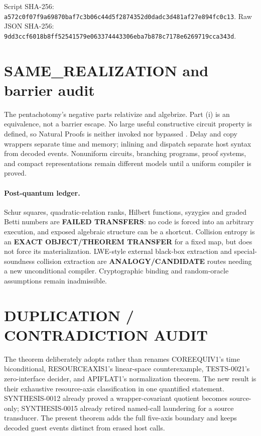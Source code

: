 \documentclass[11pt]{article}
\begin{document}
Script SHA-256:
\nolinkurl{a572c0f07f9a69870baf7c3b06c44d5f2874352d0dadc3d481af27e894fc0c13}.
Raw JSON SHA-256:
\nolinkurl{9dd3ccf6018b8ff52541579e063374443306eba7b878c7178e6269719cca343d}.

\section{SAME\_REALIZATION and barrier audit}
The pentachotomy's negative parts relativize and algebrize.  Part (i) is an
equivalence, not a barrier escape.  No large useful constructive circuit
property is defined, so Natural Proofs is neither invoked nor bypassed
\cite{RR97}.  Delay and copy wrappers separate time and memory; inlining and
dispatch separate host syntax from decoded events.  Nonuniform circuits,
branching programs, proof systems, and compact representations remain
different models until a uniform compiler is proved.

\paragraph{Post-quantum ledger.}
Schur squares, quadratic-relation ranks, Hilbert functions, syzygies and
graded Betti numbers are \textbf{FAILED TRANSFERS}: no code is forced into
an arbitrary execution, and exposed algebraic structure can be a shortcut.
Collision entropy is an \textbf{EXACT OBJECT/THEOREM TRANSFER} for a fixed
map, but does not force its materialization.  LWE-style external black-box
extraction and special-soundness collision extraction are
\textbf{ANALOGY/CANDIDATE} routes needing a new unconditional compiler.
Cryptographic binding and random-oracle assumptions remain inadmissible.

\section{DUPLICATION / CONTRADICTION AUDIT}
The theorem deliberately adopts rather than renames COREEQUIV1's time
biconditional, RESOURCEAXIS1's linear-space counterexample, TESTS-0021's
zero-interface decider, and APIFLAT1's normalization theorem.  The new result
is their exhaustive resource-axis classification in one quantified statement.
SYNTHESIS-0012 already proved a wrapper-covariant quotient becomes source-
only; SYNTHESIS-0015 already retired named-call laundering for a source
transducer.  The present theorem adds the full five-axis boundary and keeps
decoded guest events distinct from erased host calls.
\end{document}
